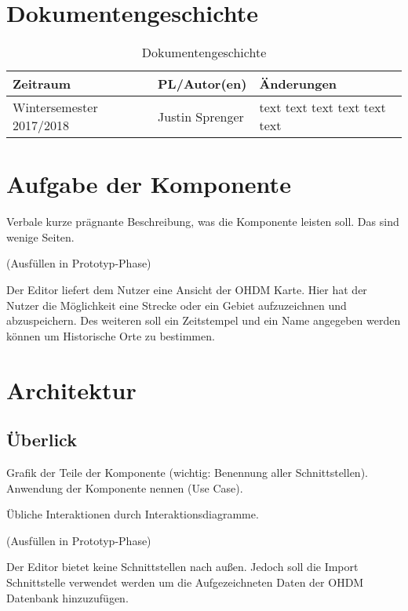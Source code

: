 \usepackage{url}
\section{Dokumentengeschichte}
\begin{table}[h]
 \begin{tabular}{|l|l|p{4cm}|}
 \hline
 Zeitraum & PL/Autor(en) & Änderungen \\
 \hline
 Wintersemester 2017/2018 & Justin Sprenger & 
text \newline 
text \newline 
text \newline 
text \newline 
text \newline 
text \newline 
 
  \\
 \hline
 \end{tabular}
 \caption{Dokumentengeschichte}
 \end{table}

\section{Aufgabe der Komponente}
Verbale kurze prägnante Beschreibung, was die Komponente leisten soll.
Das sind wenige Seiten.

(Ausfüllen in Prototyp-Phase)

Der Editor liefert dem Nutzer eine Ansicht der OHDM Karte. Hier hat der Nutzer die Möglichkeit eine Strecke oder ein Gebiet aufzuzeichnen und abzuspeichern. Des weiteren soll ein Zeitstempel und ein Name angegeben werden können um Historische Orte zu bestimmen.

\section{Architektur}

\subsection{Überlick}
Grafik der Teile der Komponente (wichtig: Benennung aller Schnittstellen). 
Anwendung der Komponente nennen (Use Case).

Übliche Interaktionen durch Interaktionsdiagramme.

(Ausfüllen in Prototyp-Phase)

Der Editor bietet keine Schnittstellen nach außen. Jedoch soll die Import Schnittstelle verwendet werden um die Aufgezeichneten Daten der OHDM Datenbank hinzuzufügen.

